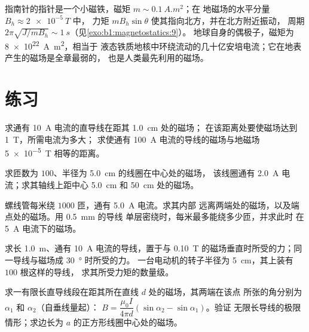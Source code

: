 \begin{example}[指南针与地球]\label{ex:b1:magnetostatics:compass}
指南针的指针是一个小磁铁，磁矩 $m \sim \qty{0.1}{A.m^2}$；在
地磁场的水平分量 $B_h \approx \qty{2e-5}{T}$ 中，
力矩 $mB_h\sin\theta$ 使其指向北方，并在北方附近振动，
周期 $2\pi\sqrt{J/mB_h} \sim \qty{1}{s}$（见\cref{exo:b1:magnetostatics:9}）。
地球自身的偶极子，磁矩为 \qty{8e22}{A.m^2}，相当于
液态铁质地核中环绕流动的几十亿安培电流；它在地表
产生的磁场是全章最弱的，
也是人类最先利用的磁场。
\end{example}

\section{练习}

\begin{exercise}[$\star$]\label{exo:b1:magnetostatics:1}
求通有 \qty{10}{A} 电流的直导线在距其 \qty{1.0}{cm} 处的磁场；
在该距离处要使磁场达到 \qty{1}{T}，所需电流为多大；
求使通有 \qty{100}{A} 电流的导线的磁场与地磁场 \qty{5e-5}{T} 相等的距离。
\end{exercise}

\begin{exercise}[$\star$]\label{exo:b1:magnetostatics:2}
求匝数为 $100$、半径为 \qty{5.0}{cm} 的线圈在中心处的磁场，
该线圈通有 \qty{2.0}{A} 电流；求其轴线上距中心
\qty{5.0}{cm} 和 \qty{50}{cm} 处的磁场。
\end{exercise}

\begin{exercise}[$\star$]\label{exo:b1:magnetostatics:3}
螺线管每米绕 $1000$ 匝，通有 \qty{5.0}{A} 电流。求其内部
远离两端处的磁场，以及端点处的磁场。用 \qty{0.5}{mm} 的导线
单层密绕时，每米最多能绕多少匝，并求此时
在 \qty{5}{A} 电流下的磁场。
\end{exercise}

\begin{exercise}[$\star$]\label{exo:b1:magnetostatics:4}
求长 \qty{1.0}{m}、通有 \qty{10}{A} 电流的导线，置于与
\qty{0.10}{T} 的磁场垂直时所受的力；同一导线与磁场成 \qty{30}{\degree} 时所受的力。
一台电动机的转子半径为 \qty{5}{cm}，其上装有 $100$ 根这样的导线，
求其所受力矩的数量级。
\end{exercise}

\begin{exercise}[$\star\star$]\label{exo:b1:magnetostatics:5}
求一有限长直导线段在距其所在直线 $d$ 处的磁场，其两端在该点
所张的角分别为 $\alpha_1$ 和 $\alpha_2$（自垂线量起）：
$B = \dfrac{\mu_0I}{4\pi d}(\sin\alpha_2 - \sin\alpha_1)$。验证
无限长导线的极限情形；求边长为
$a$ 的正方形线圈中心处的磁场。
\end{exercise}

